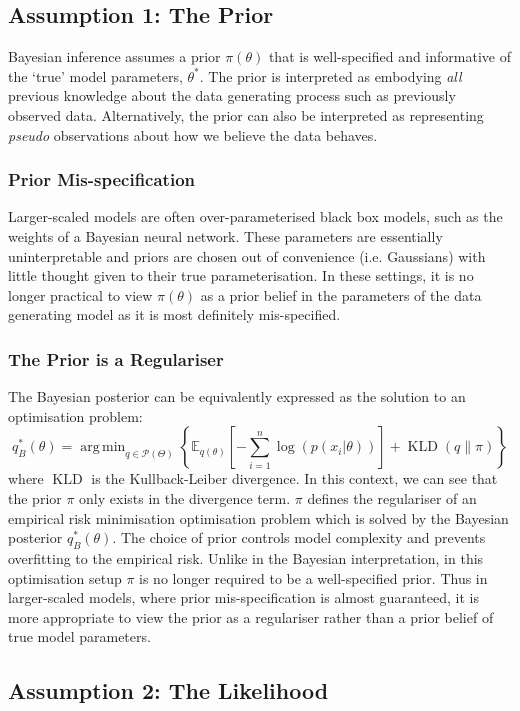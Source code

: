 \documentclass[twoside,11pt]{article}
\newcommand{\KLD}{\operatorname{KLD}}
\DeclareMathOperator*{\argmin}{arg\,min}
\begin{document}
\subsection{Assumption 1: The Prior}
Bayesian inference assumes a prior $\pi(\theta)$ that is well-specified and informative of the `true' model parameters, $\theta^*$. The prior is interpreted as embodying \textit{all} previous knowledge about the data generating process such as previously observed data. Alternatively, the prior can also be interpreted as representing \textit{pseudo} observations about how we believe the data behaves.
\subsubsection{Prior Mis-specification}
Larger-scaled models are often over-parameterised black box models, such as the weights of a Bayesian neural network. These parameters are essentially uninterpretable and priors are chosen out of convenience (i.e. Gaussians) with little thought given to their true parameterisation. In these settings, it is no longer practical to view $\pi(\theta)$ as a prior belief in the parameters of the data generating model as it is most definitely mis-specified.
\subsubsection{The Prior is a Regulariser}
The Bayesian posterior can be equivalently expressed as the solution to an optimisation problem:
\[q_B^*(\theta) = \argmin_{q \in \mathcal{P}(\Theta)} \left\{\mathbb{E}_{q(\theta)}\left[-\sum_{i=1}^n \log\left(p(x_i|\theta)\right)\right] + \KLD(q\|\pi)\right\}\]
where $\KLD$ is the Kullback-Leiber divergence. In this context, we can see that the prior $\pi$ only exists in the divergence term. $\pi$ defines the regulariser of an empirical risk minimisation optimisation problem which is solved by the Bayesian posterior $q_B^*(\theta)$. The choice of prior controls model complexity and prevents overfitting to the empirical risk. Unlike in the Bayesian interpretation, in this optimisation setup $\pi$ is no longer required to be a well-specified prior. Thus in larger-scaled models, where prior mis-specification is almost guaranteed, it is more appropriate to view the prior as a regulariser rather than a prior belief of true model parameters.

\subsection{Assumption 2: The Likelihood}
\end{document}
